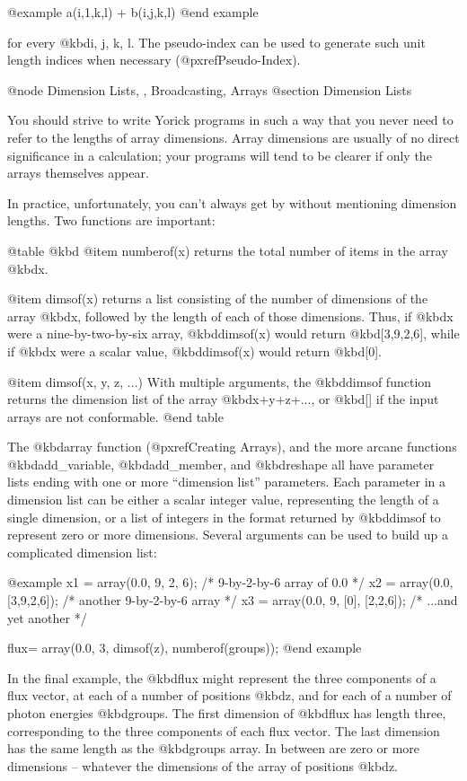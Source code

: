 @example
a(i,1,k,l) + b(i,j,k,l)
@end example

for every @kbd{i, j, k, l}.  The pseudo-index can be used to generate
such unit length indices when necessary (@pxref{Pseudo-Index}).



@node    Dimension Lists,  , Broadcasting, Arrays
@section Dimension Lists

You should strive to write Yorick programs in such a way that you never
need to refer to the lengths of array dimensions.  Array dimensions are
usually of no direct significance in a calculation; your programs will
tend to be clearer if only the arrays themselves appear.

In practice, unfortunately, you can't always get by without mentioning
dimension lengths.  Two functions are important:

@table @kbd
@item numberof(x)
returns the total number of items in the array @kbd{x}.

@item dimsof(x)
returns a list consisting of the number of dimensions of the array @kbd{x},
followed by the length of each of those dimensions.  Thus, if @kbd{x} were
a nine-by-two-by-six array, @kbd{dimsof(x)} would return @kbd{[3,9,2,6]},
while if @kbd{x} were a scalar value, @kbd{dimsof(x)} would return
@kbd{[0]}.

@item dimsof(x, y, z, ...)
With multiple arguments, the @kbd{dimsof} function returns the dimension
list of the array @kbd{x+y+z+...}, or @kbd{[]} if the input arrays are not
conformable.
@end table

The @kbd{array} function (@pxref{Creating Arrays}), and the more arcane
functions @kbd{add_variable}, @kbd{add_member}, and @kbd{reshape} all
have parameter lists ending with one or more ``dimension list''
parameters.  Each parameter in a dimension list can be either a scalar
integer value, representing the length of a single dimension, or a
list of integers in the format returned by @kbd{dimsof} to represent
zero or more dimensions.  Several arguments can be used to build up
a complicated dimension list:

@example
x1 = array(0.0, 9, 2, 6);     /* 9-by-2-by-6 array of 0.0 */
x2 = array(0.0, [3,9,2,6]);  /* another 9-by-2-by-6 array */
x3 = array(0.0, 9, [0], [2,2,6]);   /* ...and yet another */

flux= array(0.0, 3, dimsof(z), numberof(groups));
@end example

In the final example, the @kbd{flux} might represent the three
components of a flux vector, at each of a number of positions @kbd{z},
and for each of a number of photon energies @kbd{groups}.  The first
dimension of @kbd{flux} has length three, corresponding to the three
components of each flux vector.  The last dimension has the same length
as the @kbd{groups} array.  In between are zero or more dimensions --
whatever the dimensions of the array of positions @kbd{z}.

